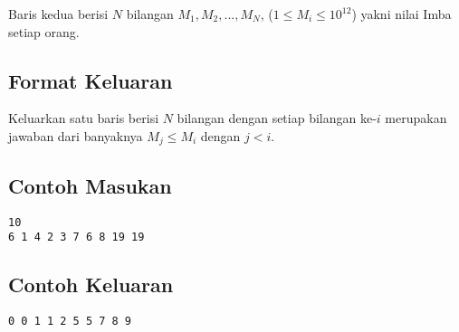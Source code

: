 \documentclass{article}
\begin{document}
Baris kedua berisi $N$ bilangan $M_1, M_2, ..., M_N$, ($1 \leq M_i \leq 10^{12}$) yakni nilai Imba setiap orang.

\subsection*{Format Keluaran}

Keluarkan satu baris berisi $N$ bilangan dengan setiap bilangan ke-$i$ merupakan jawaban dari banyaknya $M_j \leq M_i$ dengan $j < i$.

\begin{multicols}{2}
\subsection*{Contoh Masukan}
\begin{lstlisting}
10
6 1 4 2 3 7 6 8 19 19
\end{lstlisting}
\columnbreak
\subsection*{Contoh Keluaran}
\begin{lstlisting}
0 0 1 1 2 5 5 7 8 9
\end{lstlisting}
\vfill
\null
\end{multicols}


\pagebreak
\end{document}
